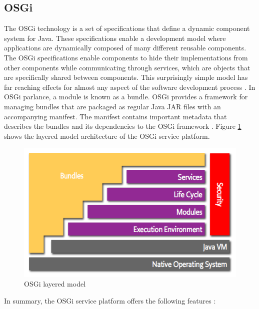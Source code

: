 \subsection{OSGi}
The \gls{OSGi} technology is a set of specifications that define a dynamic component system for Java. These specifications enable a development model where applications are dynamically composed of many different reusable components. The \gls{OSGi} specifications enable components to hide their implementations from other components while communicating through services, which are objects that are specifically shared between components. This surprisingly simple model has far reaching effects for almost any aspect of the software development process \cite{OSGi}. In OSGi parlance, a module is known as a bundle. OSGi provides a framework for managing bundles that are packaged as regular Java JAR files with an accompanying manifest. The manifest contains important metadata that describes the bundles and its dependencies to the OSGi framework \cite{Knoernschild:2012}. Figure \ref{fig:layering-osgi} shows the layered model architecture of the \gls{OSGi} service platform.

\begin{figure}[H]
\centering
\includegraphics[width=\textwidth]{layering-osgi.png}
\caption{\gls{OSGi} layered model \cite{OSGi}}
\label{fig:layering-osgi}
\end{figure}

\newpage
In summary, the \gls{OSGi} service platform offers the following features \cite{Knoernschild:2012}:

